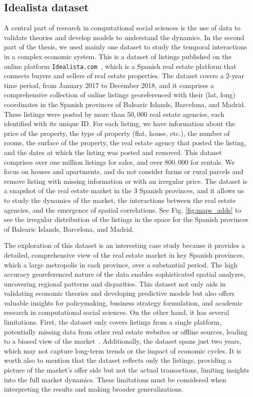 \subsection{\label{subsec:Idealista dataset} Idealista dataset}

A central part of research in computational social sciences is the use of data to validate theories and develop models to understand the dynamics. In the second part of the thesis, we used mainly one dataset to study the temporal interactions in a complex economic system. This is a dataset of listings published on the online platform \texttt{Idealista.com}~\cite{idealista}, which is a Spanish real estate platform that connects buyers and sellers of real estate properties. The dataset covers a 2-year time period, from January 2017 to December 2018, and it comprises a comprehensive collection of online listings georeferenced with their (lat, long) coordinates in the Spanish provinces of Balearic Islands, Barcelona, and Madrid. These listings were posted by more than $50,000$ real estate agencies, each identified with its unique ID. For each listing, we have information about the price of the property, the type of property (flat, house, etc.), the number of rooms, the surface of the property, the real estate agency that posted the listing, and the dates at which the listing was posted and removed. This dataset comprises over one million listings for sales, and over $800,000$ for rentals. We focus on houses and apartments, and do not consider farms or rural parcels and remove listing with missing information or with an irregular price. The dataset is a snapshot of the real estate market in the 3 Spanish provinces, and it allows us to study the dynamics of the market, the interactions between the real estate agencies, and the emergence of spatial correlations. See Fig. \ref{fig:maps_adds} to see the irregular distribution of the listings in the space for the Spanish provinces of Balearic Islands, Barcelona, and Madrid.

The exploration of this dataset is an interesting case study because it provides a detailed, comprehensive view of the real estate market in key Spanish provinces, which a large metropolis in each province, over a substantial period. The high accuracy georeferenced nature of the data enables sophisticated spatial analyzes, uncovering regional patterns and disparities. This dataset not only aids in validating economic theories and developing predictive models but also offers valuable insights for policymaking, business strategy formulation, and academic research in computational social sciences. On the other hand, it has several limitations. First, the dataset only covers listings from a single platform, potentially missing data from other real estate websites or offline sources, leading to a biased view of the market~\cite{gonzalez2014assessing}. Additionally, the dataset spans just two years, which may not capture long-term trends or the impact of economic cycles. It is worth also to mention that the dataset reflects only the listings, providing a picture of the market's offer side but not the actual transactions, limiting insights into the full market dynamics. These limitations must be considered when interpreting the results and making broader generalizations.


